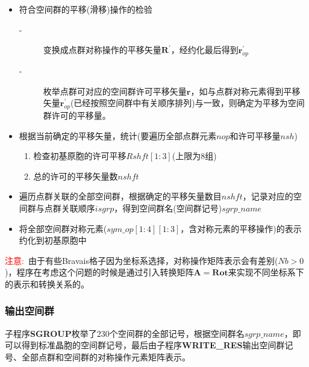 \begin{itemize}
	\item 符合空间群的平移(滑移)操作的检验
		\begin{description}
			\item[-] 变换成点群对称操作的平移矢量$\mathbf{R}^{\prime}$，经约化最后得到$\mathbf{r}_{op}^{\prime}$
			\item[-] 枚举点群可对应的空间群许可平移矢量$\mathbf{r}$，如与点群对称元素得到平移矢量$\mathbf{r}_{op}^{\prime}$(已经按照空间群中有关顺序排列)与一致，则确定为平移为空间群许可的平移量。
		\end{description}
	\item 根据当前确定的平移矢量，统计(要遍历全部点群元素$\mathit{nop}$和许可平移量$\mathit{nsh}$)
		\begin{enumerate}
			\item 检查初基原胞的许可平移$Rshft[1:3]$(上限为8组)
			\item 总的许可的平移矢量数$\mathit{nshft}$
		\end{enumerate}
	\item 遍历点群关联的全部空间群，根据确定的平移矢量数目$\mathit{nshft}$，记录对应的空间群与点群关联顺序$\mathit{isgrp}$，得到空间群名(空间群记号)$\mathit{sgrp\_name}$
	\item 将全部空间群对称元素($\mathit{sym\_op}[1:4][1:3]$，含对称元素的平移操作)的表示约化到初基原胞中
\end{itemize}
\textcolor{red}{注意:~}由于有些\textrm{Bravais}格子因为坐标系选择，对称操作矩阵表示会有差别($\mathit{Nb}>0$)，程序在考虑这个问题的时候是通过引入转换矩阵$\mathbf{A}=\mathbf{Rot}$来实现不同坐标系下的表示和转换关系的。
\subsubsection{输出空间群}
子程序\textbf{SGROUP}枚举了230个空间群的全部记号，根据空间群名$\mathit{sgrp\_name}$，即可以得到标准晶胞的空间群记号，最后由子程序\textbf{WRITE\_RES}输出空间群记号、全部点群和空间群的对称操作元素矩阵表示。


